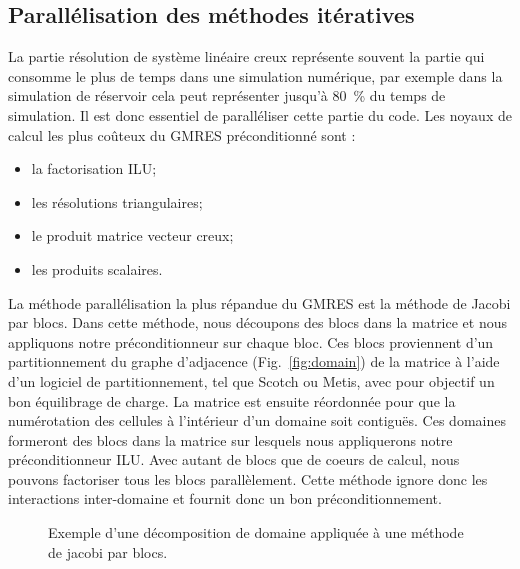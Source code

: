 \subsection{Parallélisation des méthodes itératives}
La partie résolution de système linéaire creux représente souvent la partie qui consomme le plus de temps dans une simulation numérique, par exemple dans la simulation de réservoir cela peut représenter jusqu'à 80~\% du temps de simulation.
%
Il est donc essentiel de paralléliser cette partie du code.
%
Les noyaux de calcul les plus coûteux du GMRES préconditionné sont :
\begin{itemize}
  \item la factorisation ILU;
  \item les résolutions triangulaires;
  \item le produit matrice vecteur creux;
  \item les produits scalaires.
\end{itemize}

La méthode parallélisation la plus répandue du GMRES est la méthode de Jacobi par blocs.
%
Dans cette méthode, nous découpons des blocs dans la matrice et nous appliquons notre préconditionneur sur chaque bloc.
%
Ces blocs proviennent d'un partitionnement du graphe d'adjacence (Fig.~\ref{fig:domain}) de la matrice à l'aide d'un logiciel de partitionnement, tel que Scotch ou Metis, avec pour objectif un bon équilibrage de charge.
%
La matrice est ensuite réordonnée pour que la numérotation des cellules à l'intérieur d'un domaine soit contiguës.
%
Ces domaines formeront des blocs dans la matrice sur lesquels nous appliquerons notre préconditionneur ILU.
%
Avec autant de blocs que de coeurs de calcul, nous pouvons factoriser tous les blocs parallèlement.
%
Cette méthode ignore donc les interactions inter-domaine et fournit donc un bon préconditionnement.



\begin{figure}[!h]
     \begin{center}
    \end{center}
    \caption{Exemple d'une décomposition de domaine appliquée à une méthode de jacobi par blocs.}
    \label{fig:jacobi}
\end{figure}


